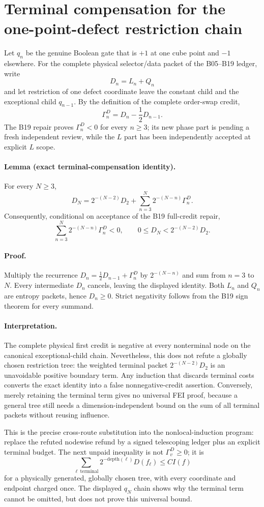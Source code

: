 \section*{Terminal compensation for the one-point-defect restriction chain}

Let $q_n$ be the genuine Boolean gate that is $+1$ at one cube point
and $-1$ elsewhere.  For the complete physical selector/data packet of
the B05--B19 ledger, write
\[
 D_n=L_n+Q_n
\]
and let restriction of one defect coordinate leave the constant child
and the exceptional child $q_{n-1}$.  By the definition of the complete
order-swap credit,
\[
 \Gamma_n^D=D_n-\frac12D_{n-1}.
\]
The B19 repair proves $\Gamma_n^D<0$ for every $n\ge3$; its new phase
part is pending a fresh independent review, while the $L$ part has been
independently accepted at explicit $L$ scope.

\paragraph{Lemma (exact terminal-compensation identity).}
For every $N\ge3$,
\[
 \boxed{
 D_N=2^{-(N-2)}D_2+
 \sum_{n=3}^{N}2^{-(N-n)}\Gamma_n^D.}
\]
Consequently, conditional on acceptance of the B19 full-credit repair,
\[
 \sum_{n=3}^{N}2^{-(N-n)}\Gamma_n^D<0,
 \qquad
 0\le D_N<2^{-(N-2)}D_2.
\]

\paragraph{Proof.}
Multiply the recurrence
$D_n=\frac12D_{n-1}+\Gamma_n^D$ by $2^{-(N-n)}$ and sum from
$n=3$ to $N$.  Every intermediate $D_n$ cancels, leaving the displayed
identity.  Both $L_n$ and $Q_n$ are entropy packets, hence $D_n\ge0$.
Strict negativity follows from the B19 sign theorem for every summand.

\paragraph{Interpretation.}
The complete physical first credit is negative at every nonterminal
node on the canonical exceptional-child chain.  Nevertheless, this does
not refute a globally chosen restriction tree: the weighted terminal
packet $2^{-(N-2)}D_2$ is an unavoidable positive boundary term.  Any
induction that discards terminal costs converts the exact identity into
a false nonnegative-credit assertion.  Conversely, merely retaining the
terminal term gives no universal FEI proof, because a general tree still
needs a dimension-independent bound on the sum of all terminal packets
without reusing influence.

This is the precise cross-route substitution into the nonlocal-induction
program: replace the refuted nodewise refund by a signed telescoping
ledger plus an explicit terminal budget.  The next unpaid inequality is
not $\Gamma_v^D\ge0$; it is
\[
 \sum_{\ell\ \mathrm{terminal}}2^{-\mathrm{depth}(\ell)}D(f_\ell)
 \le C I(f)
\]
for a physically generated, globally chosen tree, with every coordinate
and endpoint charged once.  The displayed $q_N$ chain shows why the
terminal term cannot be omitted, but does not prove this universal bound.
